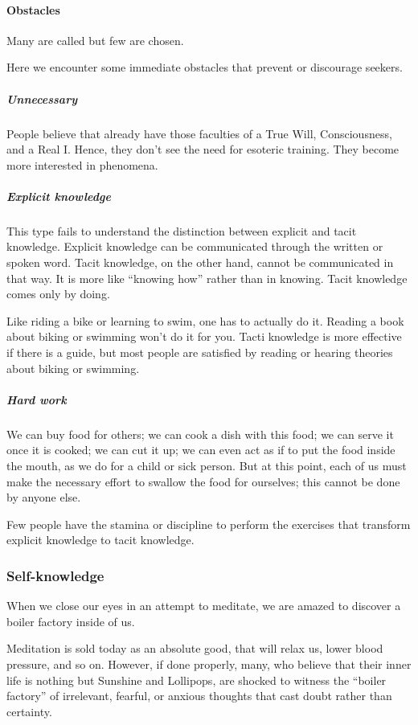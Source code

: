 \paragraph{Obstacles}
\begin{quotex}
Many are called but few are chosen. 

\end{quotex}
Here we encounter some immediate obstacles that prevent or discourage seekers.

\subparagraph{Unnecessary}
People believe that already have those faculties of a True Will, Consciousness, and a Real I. Hence, they don't see the need for esoteric training. They become more interested in phenomena.

\subparagraph{Explicit knowledge}
This type fails to understand the distinction between explicit and tacit knowledge. Explicit knowledge can be communicated through the written or spoken word. Tacit knowledge, on the other hand, cannot be communicated in that way. It is more like “knowing how” rather than in knowing. Tacit knowledge comes only by doing.

Like riding a bike or learning to swim, one has to actually do it. Reading a book about biking or swimming won't do it for you. Tacti knowledge is more effective if there is a guide, but most people are satisfied by reading or hearing theories about biking or swimming.

\subparagraph{Hard work}
\begin{quotex}
We can buy food for others; we can cook a dish with this food; we can serve it once it is cooked; we can cut it up; we can even act as if to put the food inside the mouth, as we do for a child or sick person. But at this point, each of us must make the necessary effort to swallow the food for ourselves; this cannot be done by anyone else. 

\end{quotex}
Few people have the stamina or discipline to perform the exercises that transform explicit knowledge to tacit knowledge.

\subsubsection{Self-knowledge}
\begin{quotex}
When we close our eyes in an attempt to meditate, we are amazed to discover a boiler factory inside of us. 

\end{quotex}
Meditation is sold today as an absolute good, that will relax us, lower blood pressure, and so on. However, if done properly, many, who believe that their inner life is nothing but Sunshine and Lollipops, are shocked to witness the “boiler factory” of irrelevant, fearful, or anxious thoughts that cast doubt rather than certainty.

